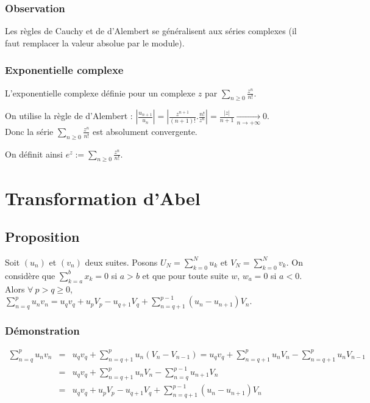 \documentclass[a4paper,10pt]{book} %
\newcommand{\displayAmath}{\displaystyle}
\begin{document}
\subsubsection{Observation}
Les règles de Cauchy et de d'Alembert se généralisent aux séries complexes (il faut remplacer la valeur absolue par le module).

\subsubsection{Exponentielle complexe}
L'exponentielle complexe définie pour un complexe $z$ par $\sum_{n\geq 0}\frac{z^n}{n!}$.\smallskip

On utilise la règle de d'Alembert : $|\frac{u_{n+1}}{u_n}|=|\frac{z^{n+1}}{(n+1)!}.
\frac{n!}{z^n}|=\frac{|z|}{n+1}\underset{n\rightarrow +\infty}{\rightarrow}0$.\\
Donc la série $\sum_{n\geq 0}\frac{z^n}{n!}$ est absolument convergente.\smallskip

On définit ainsi $e^z:=\sum_{n\geq 0}\frac{z^n}{n!}$.

\section{Transformation d'Abel}
\subsection{Proposition}
Soit $(u_n)$ et $(v_n)$ deux suites. Posons $\displayAmath U_N=\sum_{k=0}^N u_k$ et $\displayAmath V_N=\sum_{k=0}^N v_k$. On considère que $\displayAmath\sum_{k=a}^b x_{k}=0$ si $a>b$ et que pour toute suite $w$, $w_a=0$ si $a<0$.\\
Alors $\forall~p>q\geq 0$, $\displayAmath\sum_{n=q}^pu_nv_n=u_qv_q+u_pV_p-u_{q+1}V_q+\sum_{n=q+1}^{p-1}(u_n-u_{n+1})V_n$.

\subsubsection{Démonstration}
$\begin{array}{rcl}\displayAmath\sum_{n=q}^p u_nv_n&=&\displayAmath u_qv_q+\sum_{n=q+1}^p u_n(V_n-V_{n-1})=u_qv_q+\sum_{n=q+1}^p u_nV_n-\sum_{n=q+1}^pu_nV_{n-1} \\
&=&\displayAmath u_qv_q+ \sum_{n=q+1}^pu_nV_n-\sum_{n=q}^{p-1}u_{n+1}V_n\\
&=&\displayAmath u_qv_q+u_pV_p-u_{q+1}V_q+ \sum_{n=q+1}^{p-1}(u_n-u_{n+1})V_n \end{array}$
\end{document}
